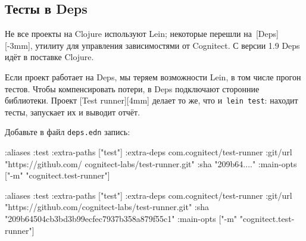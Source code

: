 \begin{english}
\end{english}

\subsection{Тесты в Deps}


Не все проекты на Clojure используют Lein; некоторые перешли
на~[Deps][-3mm],
утилиту для управления зависимостями от Cognitect. С версии 1.9 Deps идёт в
поставке Clojure.


Если проект работает на Deps, мы теряем возможности Lein, в том числе прогон
тестов. Чтобы компенсировать потери, в Deps подключают сторонние
библиотеки. Проект [Test runner][4mm]
делает то же, что и~\verb|lein test|: находит тесты, запускает их и выводит
отчёт.

Добавьте в файл \verb|deps.edn| запись:

\ifx\DEVICETYPE\MOBILE

\begin{english}
  \begin{clojure}
:aliases
{:test
 {:extra-paths ["test"]
  :extra-deps
  {com.cognitect/test-runner
   {:git/url
    "https://github.com/
         cognitect-labs/test-runner.git"
    :sha "209b64...."}}
  :main-opts
  ["-m" "cognitect.test-runner"]}}
  \end{clojure}
\end{english}

\else

\begin{english}
  \begin{clojure}
:aliases
{:test
 {:extra-paths ["test"]
  :extra-deps
  {com.cognitect/test-runner
   {:git/url "https://github.com/cognitect-labs/test-runner.git"
    :sha "209b64504cb3bd3b99ecfec7937b358a879f55c1"}}
  :main-opts ["-m" "cognitect.test-runner"]}}
  \end{clojure}
\end{english}

\fi


